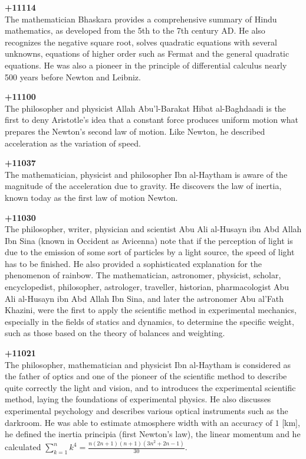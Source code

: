 \textbf{+11114}\\
The mathematician Bhaskara provides a comprehensive summary of Hindu mathematics, as developed from the 5th to the 7th century AD. He also recognizes the negative square root, solves quadratic equations with several unknowns, equations of higher order such as Fermat and the general quadratic equations. He was also a pioneer in the principle of differential calculus nearly 500 years before Newton and Leibniz.

\textbf{+11100}\\
The philosopher and physicist Allah Abu'l-Barakat Hibat al-Baghdaadi is the first to deny Aristotle's idea that a constant force produces uniform motion what prepares the Newton's second law of motion. Like Newton, he described acceleration as the variation of speed.

\textbf{+11037}\\
The mathematician, physicist and philosopher Ibn al-Haytham is aware of the magnitude of the acceleration due to gravity. He discovers the law of inertia, known today as the first law of motion Newton.

\textbf{+11030}\\
The philosopher, writer, physician and scientist Abu Ali al-Husayn ibn Abd Allah Ibn Sina (known in Occident as Avicenna) note that if the perception of light is due to the emission of some sort of particles by a light source, the speed of light has to be finished. He also provided a sophisticated explanation for the phenomenon of rainbow. The mathematician, astronomer, physicist, scholar, encyclopedist, philosopher, astrologer, traveller, historian, pharmacologist Abu Ali al-Husayn ibn Abd Allah Ibn Sina, and later the astronomer Abu al'Fath Khazini, were the first to apply the scientific method in experimental mechanics, especially in the fields of statics and dynamics, to determine the specific weight, such as those based on the theory of balances and weighting.

\textbf{+11021}\\
The philosopher, mathematician and physicist Ibn al-Haytham is considered as the father of optics and one of the pioneer of the scientific method to describe quite correctly the light and vision, and to introduces the experimental scientific method, laying the foundations of experimental physics. He also discusses experimental psychology and describes various optical instruments such as the darkroom. He was able to estimate atmosphere width with an accuracy of $1$ [km], he defined the inertia principia (first Newton's law), the linear momentum and he calculated $\sum_{k=1}^n k^4=\frac{n(2n+1)(n+1)(3n^2+2n-1)}{30}$.

